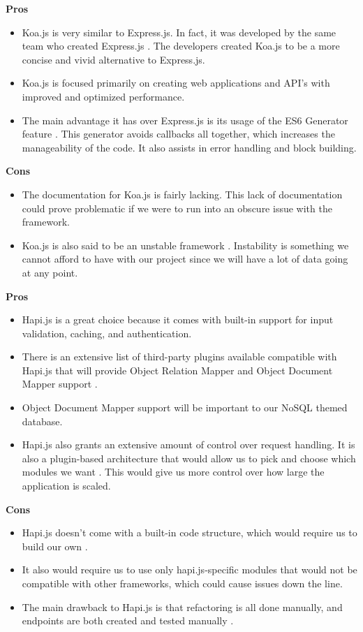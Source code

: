 		\textbf{Pros}
			\begin{itemize}
				\item Koa.js is very similar to Express.js. In fact, it was developed by the same team who created Express.js \cite{expressKoaSails}. The developers created Koa.js to be a more concise and vivid alternative to Express.js. 
				\item Koa.js is focused primarily on creating web applications and API's with improved and optimized performance. 
				\item The main advantage it has over Express.js is its usage of the ES6 Generator feature \cite{expressKoaSails}. This generator avoids callbacks all together, which increases the manageability of the code. It also assists in error handling and block building.
			\end{itemize}	
		\textbf{Cons}
			\begin{itemize}
				\item The documentation for Koa.js is fairly lacking. This lack of documentation could prove problematic if we were to run into an obscure issue with the framework. 
				\item Koa.js is also said to be an unstable framework \cite{expressKoaSails}. Instability is something we cannot afford to have with our project since we will have a lot of data going at any point.
			\end{itemize}	
	
		\textbf{Pros} 
			\begin{itemize}
				\item Hapi.js is a great choice because it comes with built-in support for input validation, caching, and authentication. 
				\item There is an extensive list of third-party plugins available compatible with Hapi.js that will provide Object Relation Mapper and Object Document Mapper support \cite{hapi}. 
				\item Object Document Mapper support will be important to our NoSQL themed database. 
				\item Hapi.js also grants an extensive amount of control over request handling. It is also a plugin-based architecture that would allow us to pick and choose which modules we want \cite{hapi}. This would give us more control over how large the application is scaled.
			\end{itemize}	
		\textbf{Cons}
			\begin{itemize}
				\item Hapi.js doesn't come with a built-in code structure, which would require us to build our own \cite{hapi}.
				\item It also would require us to use only hapi.js-specific modules that would not be compatible with other frameworks, which could cause issues down the line. 
				\item The main drawback to Hapi.js is that refactoring is all done manually, and endpoints are both created and tested manually \cite{hapi}.
			\end{itemize}	
	

